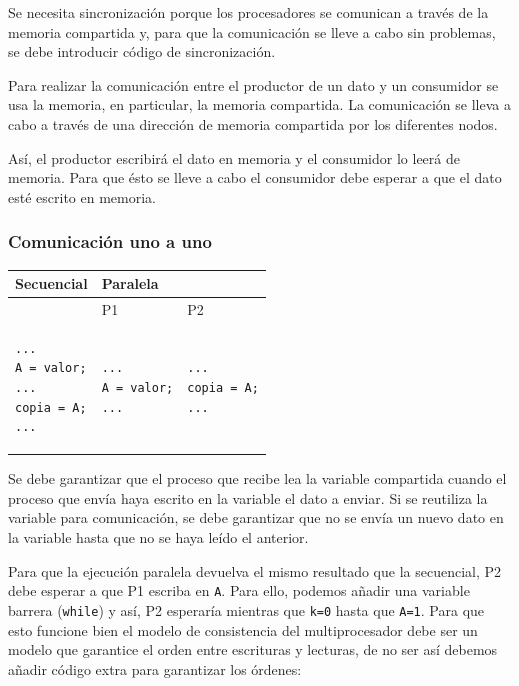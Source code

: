 \documentclass[10pt,a4paper,spanish]{report}
\begin{document}
Se necesita sincronización porque los procesadores se comunican a través de la memoria compartida y, para que la comunicación se lleve a cabo sin problemas, se debe introducir código de sincronización.

Para realizar la comunicación entre el productor de un dato y un consumidor se usa la memoria, en particular, la memoria compartida. La comunicación se lleva a cabo a través de una dirección de memoria compartida por los diferentes nodos.

Así, el productor escribirá el dato en memoria y el consumidor lo leerá de memoria. Para que ésto se lleve a cabo el consumidor debe esperar a que el dato esté escrito en memoria.

\textcolor[rgb]{0.2,0.4,0.8}{\subsubsection{Comunicación uno a uno}}
\begin{tabular}{|p{7cm}|p{3.5cm}|p{3.5cm}|}
\hline
Secuencial & \multicolumn{2}{|l|}{Paralela} \\
\hline
& P1 & P2 \\ \cline{2-3}
\begin{verbatim}
...
A = valor;
...
copia = A;
...
\end{verbatim}
&
\begin{verbatim}
...
A = valor;
...
\end{verbatim}
&
\begin{verbatim}
...
copia = A;
...
\end{verbatim}
\\
\hline
\end{tabular}

Se debe garantizar que el proceso que recibe lea la variable compartida cuando el proceso que envía haya escrito en la variable el dato a enviar. Si se reutiliza la variable para comunicación, se debe garantizar que no se envía un nuevo dato en la variable hasta que no se haya leído el anterior.

Para que la ejecución paralela devuelva el mismo resultado que la secuencial, P2 debe esperar a que P1 escriba en \verb*|A|. Para ello, podemos añadir una variable barrera (\verb*|while|) y así, P2 esperaría mientras que \verb*|k=0| hasta que \verb*|A=1|. Para que esto funcione bien el modelo de consistencia del multiprocesador debe ser un modelo que garantice el orden entre escrituras y lecturas, de no ser así debemos añadir código extra para garantizar los órdenes:
\end{document}
